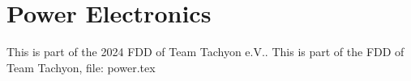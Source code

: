 \section{Power Electronics}

This is part of the 2024 FDD of Team Tachyon e.V..
This is part of the FDD of Team Tachyon, file: power.tex
